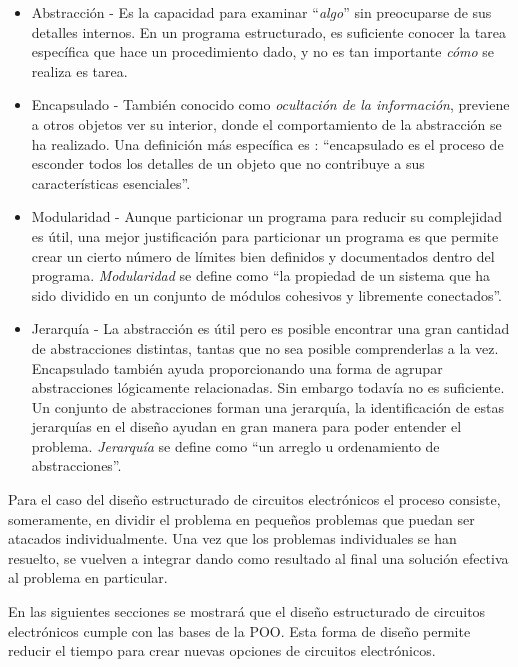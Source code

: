 \documentclass[10pt,twocolumn,twoside,letterpaper]{IEEEtran}
\begin{document}
{\begin{itemize}
\item Abstracci\'on - Es la capacidad para examinar ``{\it algo}'' sin preocuparse de sus detalles internos. En un programa estructurado, es suficiente conocer la tarea espec\'ifica que hace un pro\-ce\-di\-mien\-to dado, y no es tan importante {\it c\'omo} se realiza es tarea.
\item Encapsulado - Tambi\'en conocido como {\it ocultaci\'on de la informaci\'on}, previene a otros objetos ver su interior, donde el comportamiento de la abstracci\'on se ha realizado. Una definici\'on m\'as espec\'ifica es \cite{booch}: ``encapsulado es el proceso de esconder todos los detalles de un objeto que no contribuye a sus caracter\'isticas esenciales''.
\item Modularidad - Aunque particionar un programa para reducir su complejidad es \'util, una mejor justificaci\'on para particionar un programa es que permite crear un cierto n\'umero de l\'imites bien definidos y documentados dentro del programa. {\it Modularidad} se define como ``la propiedad de un sistema que ha sido dividido en un conjunto de m\'odulos cohesivos y libremente conectados''.
\item Jerarqu\'ia - La abstracci\'on es \'util pero es posible encontrar una gran cantidad de abs\-tra\-ccio\-nes distintas, tantas que no sea posible comprenderlas a la vez. Encapsulado tambi\'en ayuda proporcionando una forma de agrupar abstracciones l\'ogicamente relacionadas. Sin embargo todav\'ia no es suficiente. Un conjunto de abstracciones forman una jerarqu\'ia, la identificaci\'on de estas jerarqu\'ias en el dise\~no ayudan en gran manera para poder entender el pro\-ble\-ma. {\it Jerarqu\'ia} se define como ``un arreglo u ordenamiento de abstracciones''.
\end{itemize}

Para el caso del dise\~no estructurado de circuitos electr\'onicos el proceso consiste, so\-me\-ra\-men\-te, en dividir el problema en peque\~nos problemas que puedan ser atacados individualmente. Una vez que los problemas individuales se han resuelto, se vuelven a integrar dando \mbox{como} resultado al final una soluci\'on efectiva al problema en particular.

En las siguientes secciones se mostrar\'a que el dise\~no estructurado de circuitos electr\'onicos cumple con las bases de la POO. Esta forma de dise\~no permite reducir el tiempo para crear nuevas opciones de circuitos electr\'onicos.

}
\end{document}
